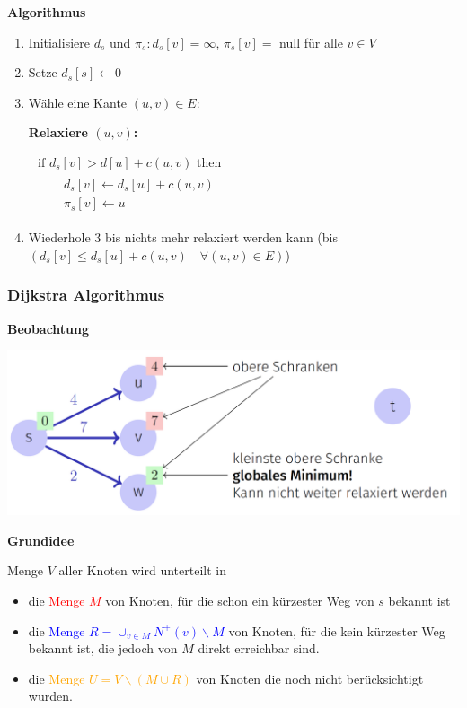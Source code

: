\begin{sectionbox}
\textbf{Algorithmus}\smallskip
\begin{enumerate}
    \item Initialisiere $d_{s}$ und $\pi_{s}: d_{s}[v]=\infty$, $\pi_{s}[v]=$ null für alle $v \in V$
    \item Setze $d_{s}[s] \leftarrow 0$
    \item Wähle eine Kante $(u, v) \in E$:\par
    \begin{greenbox}
    \textbf{Relaxiere $(u, v)$:}\par
    $\begin{array}{l}
    \text { if } d_{s}[v]>d[u]+c(u, v) \text { then } \\
    \qquad \begin{array}{l}
    d_{s}[v] \leftarrow d_{s}[u]+c(u, v) \\
    \pi_{s}[v] \leftarrow u
    \end{array}
    \end{array}$
    \end{greenbox}
    \item Wiederhole 3 bis nichts mehr relaxiert werden kann (bis $\left(d_{s}[v] \leq d_{s}[u]+c(u, v) \quad \forall(u, v) \in E\right)$)
\end{enumerate}\vspace{10px}

\subsubsection{Dijkstra Algorithmus}\smallskip
\textbf{Beobachtung}\par
\begin{center}
    \includegraphics[width = 0.85\columnwidth]{../img/DijkstraBeobachtung.png}\par
\end{center}\smallskip

\textbf{Grundidee}\par
Menge $V$ aller Knoten wird unterteilt in
\begin{itemize}
    \item die \textcolor{red}{Menge $M$} von Knoten, für die schon ein kürzester Weg von $s$ bekannt ist
    \item die \textcolor{blue}{Menge $R=\cup_{v \in M} N^{+}(v) \backslash M$} von Knoten, für die kein kürzester Weg bekannt ist, die jedoch von $M$ direkt erreichbar sind.
    \item die \textcolor{orange}{Menge $U=V \backslash(M \cup R)$} von Knoten die noch nicht berücksichtigt wurden.
\end{itemize}


\end{sectionbox}
